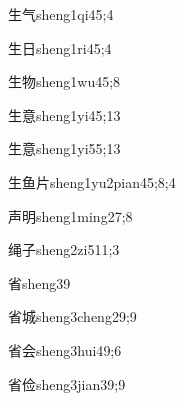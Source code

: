 \begin{verbete}{生气}{sheng1qi4}{5;4}
\end{verbete}

\begin{verbete}{生日}{sheng1ri4}{5;4}
\end{verbete}

\begin{verbete}{生物}{sheng1wu4}{5;8}
\end{verbete}

\begin{verbete}{生意}{sheng1yi4}{5;13}
\end{verbete}

\begin{verbete}{生意}{sheng1yi5}{5;13}
\end{verbete}

\begin{verbete}{生鱼片}{sheng1yu2pian4}{5;8;4}
\end{verbete}

\begin{verbete}{声明}{sheng1ming2}{7;8}
\end{verbete}

\begin{verbete}{绳子}{sheng2zi5}{11;3}
\end{verbete}

\begin{verbete}{省}{sheng3}{9}
\end{verbete}

\begin{verbete}{省城}{sheng3cheng2}{9;9}
\end{verbete}

\begin{verbete}{省会}{sheng3hui4}{9;6}
\end{verbete}

\begin{verbete}{省俭}{sheng3jian3}{9;9}
\end{verbete}

